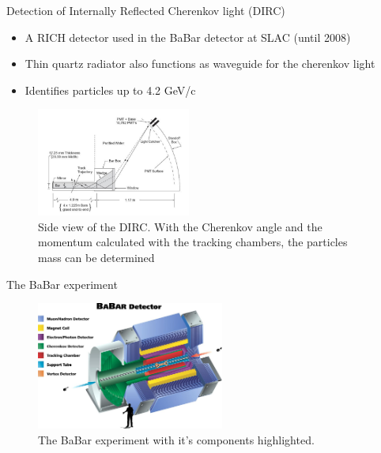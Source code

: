 \documentclass[aspectratio=1610, 10pt]{beamer}
\begin{document}
\begin{frame}{Detection of Internally Reflected Cherenkov light (DIRC)}
  \begin{itemize}
    \item A RICH detector used in the BaBar detector at SLAC (until 2008)
    \medskip
    \item Thin quartz radiator also functions as waveguide for the cherenkov light
    \medskip
    \item Identifies particles up to 4.2 GeV/c
  \end{itemize}
  \begin{figure}
    \includegraphics[width=0.45\textwidth]{images/dirc.png}
    \caption{Side view of the DIRC. With the Cherenkov angle and the momentum calculated with the tracking chambers, the
    particles mass can be determined}
  \end{figure}
\end{frame}

\begin{frame}{The BaBar experiment}
  \begin{figure}
    \includegraphics[width=0.55\textwidth]{images/babar.jpg}
    \caption{The BaBar experiment with it's components highlighted.}
  \end{figure}
\end{frame}
\end{document}
